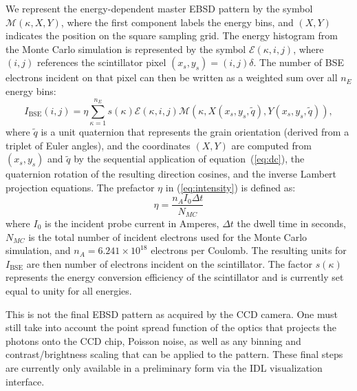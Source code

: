 \documentclass[DIV=calc, paper=letter, fontsize=11pt]{scrartcl}	 %
\begin{document}
We represent the energy-dependent master EBSD pattern by the symbol $\mathcal{M}(\kappa,X,Y)$,  where the first component labels the energy bins, 
and $(X,Y)$ indicates the position on the square sampling grid.   The energy histogram from the Monte Carlo simulation is represented by the symbol
$\mathcal{E}(\kappa,i,j)$, where $(i,j)$ references the scintillator pixel $(x_s,y_s)=(i,j)\delta$.  The number of BSE electrons incident on that pixel can then be written as
a weighted sum over all $n_E$ energy bins:
\begin{equation}
	I_{\text{BSE}}(i,j) = \eta\sum_{\kappa=1}^{n_E} s(\kappa)\mathcal{E}(\kappa,i,j) \mathcal{M}\left(\kappa,X(x_s,y_s,\tilde{q}),Y(x_s,y_s,\tilde{q})\right),\label{eq:intensity}
\end{equation}
where $\tilde{q}$ is a unit quaternion that represents the grain orientation (derived from a triplet of Euler angles), and the coordinates 
$(X,Y)$ are computed from $(x_s,y_s)$ and $\tilde{q}$ by the sequential application of equation~(\ref{eq:dc}), the quaternion rotation of the resulting
direction cosines, and the inverse Lambert projection equations.  The prefactor $\eta$ in (\ref{eq:intensity}) is defined as:
\begin{equation}
	\eta = \frac{n_A I_0 \Delta t}{N_{MC}}
\end{equation}
where $I_0$ is the incident probe current in Amperes, $\Delta t$ the dwell time in seconds, $N_{MC}$ is the total number of incident electrons
used for the Monte Carlo simulation, and $n_A=6.241\times 10^{18}$ electrons per Coulomb.  The resulting units for $I_{\text{BSE}}$ are then number of  
electrons incident on the scintillator.  The factor $s(\kappa)$ represents the energy conversion efficiency of the scintillator and is currently set equal to unity
for all energies.

This is not the final EBSD pattern as acquired by the CCD camera.  One must still take into account the point spread function of the 
optics that projects the photons onto the CCD chip, Poisson noise, as well as any binning and contrast/brightness scaling that can 
be applied to the pattern. These final steps are currently only available in a preliminary form via the IDL visualization interface.
\end{document}
